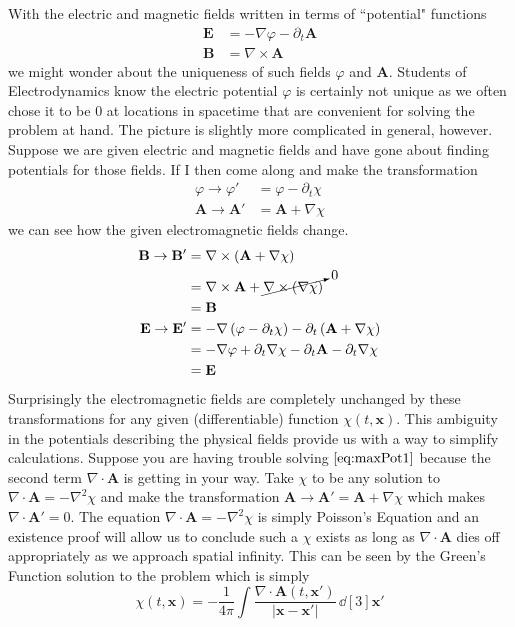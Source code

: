 With the electric and magnetic fields written in terms of ``potential" functions
\begin{align}
\mathbf{E} & = -\nabla\varphi - \partial_t\mathbf{A} \label{eq:Epotential}\\
\mathbf{B} & = \nabla\times\mathbf{A} \label{eq:Bpotential}
\end{align}
we might wonder about the uniqueness of such fields $\varphi$ and $\mathbf{A}$. Students of Electrodynamics know the electric potential $\varphi$ is certainly not unique as we often chose it to be 0 at locations in spacetime that are convenient for solving the problem at hand. The picture is slightly more complicated in general, however. Suppose we are given electric and magnetic fields and have gone about finding potentials for those fields. If I then come along and make the transformation
\begin{align}
\varphi \to \varphi' & = \varphi - \partial_t\chi \\
\mathbf{A}\to\mathbf{A}' & = \mathbf{A} + \nabla\chi
\end{align}
we can see how the given electromagnetic fields change.
\begin{align*}
\mathbf{B}\to\mathbf{B}' & = \nabla\times\left(\mathbf{A} + \nabla\chi\right) \\
 & = \nabla\times\mathbf{A} + \cancelto{0}{\nabla\times(\nabla\chi)} \\
 & = \mathbf{B} \\
\mathbf{E}\to\mathbf{E}' & = -\nabla\left(\varphi - \partial_t\chi\right) - \partial_t\left(\mathbf{A} + \nabla\chi\right) \\
 & = -\nabla\varphi + \partial_t\nabla\chi - \partial_t\mathbf{A} - \partial_t\nabla\chi \\
  & = \mathbf{E}
\end{align*}
Surprisingly the electromagnetic fields are completely unchanged by these transformations for any given (differentiable) function $\chi(t,\mathbf{x})$. This ambiguity in the potentials describing the physical fields provide us with a way to simplify calculations. Suppose you are having trouble solving $\ref{eq:maxPot1}$ because the second term $\nabla\cdot\mathbf{A}$ is getting in your way. Take $\chi$ to be any solution to $\nabla\cdot\mathbf{A} = -\nabla^2\chi$ and make the transformation $\mathbf{A}\to\mathbf{A}'=\mathbf{A} + \nabla\chi$ which makes $\nabla\cdot\mathbf{A}' = 0$. The equation $\nabla\cdot\mathbf{A} = -\nabla^2\chi$ is simply Poisson's Equation and an existence proof will allow us to conclude such a $\chi$ exists as long as $\nabla\cdot\mathbf{A}$ dies off appropriately as we approach spatial infinity. This can be seen by the Green's Function solution to the problem which is simply
\begin{equation*}
\chi(t, \mathbf{x}) = -\frac{1}{4\pi}\int \frac{\nabla\cdot\mathbf{A}(t,\mathbf{x}')}{|\mathbf{x} - \mathbf{x}'|}\,\dd[3]{\mathbf{x}'}
\end{equation*}

